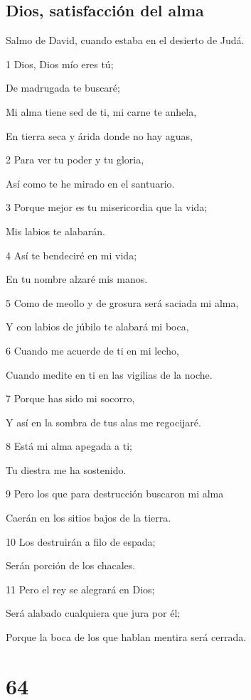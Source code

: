 \section*{Dios, satisfacción del alma}

\par Salmo de David, cuando estaba en el desierto de Judá.

\par 1 Dios, Dios mío eres tú;
\par De madrugada te buscaré;
\par Mi alma tiene sed de ti, mi carne te anhela,
\par En tierra seca y árida donde no hay aguas,
\par 2 Para ver tu poder y tu gloria,
\par Así como te he mirado en el santuario.
\par 3 Porque mejor es tu misericordia que la vida;
\par Mis labios te alabarán.
\par 4 Así te bendeciré en mi vida;
\par En tu nombre alzaré mis manos.
\par 5 Como de meollo y de grosura será saciada mi alma,
\par Y con labios de júbilo te alabará mi boca,
\par 6 Cuando me acuerde de ti en mi lecho,
\par Cuando medite en ti en las vigilias de la noche.
\par 7 Porque has sido mi socorro,
\par Y así en la sombra de tus alas me regocijaré.
\par 8 Está mi alma apegada a ti;
\par Tu diestra me ha sostenido.
\par 9 Pero los que para destrucción buscaron mi alma
\par Caerán en los sitios bajos de la tierra.
\par 10 Los destruirán a filo de espada;
\par Serán porción de los chacales.
\par 11 Pero el rey se alegrará en Dios;
\par Será alabado cualquiera que jura por él;
\par Porque la boca de los que hablan mentira será cerrada.

\chapter{64}

